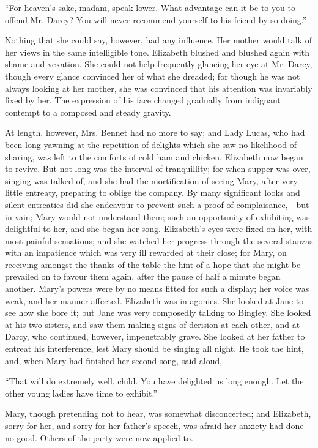 \documentclass[12pt,openright]{book}
\begin{document}
“For heaven’s sake, madam, speak lower. What advantage can it be to you to offend Mr. Darcy? You will never recommend yourself to his friend by so doing.”

Nothing that she could say, however, had any influence. Her mother would talk of her views in the same intelligible tone. Elizabeth blushed and blushed again with shame and vexation. She could not help frequently glancing her eye at Mr. Darcy, though every glance convinced her of what she dreaded; for though he was not always looking at her mother, she was convinced that his attention was invariably fixed by her. The expression of his face changed gradually from indignant contempt to a composed and steady gravity.

At length, however, Mrs. Bennet had no more to say; and Lady Lucas, who had been long yawning at the repetition of delights which she saw no likelihood of sharing, was left to the comforts of cold ham and chicken. Elizabeth now began to revive. But not long was the interval of tranquillity; for when supper was over, singing was talked of, and she had the mortification of seeing Mary, after very little entreaty, preparing to oblige the company. By many significant looks and silent entreaties did she endeavour to prevent such a proof of complaisance,—but in vain; Mary would not understand them; such an opportunity of exhibiting was delightful to her, and she began her song. Elizabeth’s eyes were fixed on her, with most painful sensations; and she watched her progress through the several stanzas with an impatience which was very ill rewarded at their close; for Mary, on receiving amongst the thanks of the table the hint of a hope that she might be prevailed on to favour them again, after the pause of half a minute began another. Mary’s powers were by no means fitted for such a display; her voice was weak, and her manner affected. Elizabeth was in agonies. She looked at Jane to see how she bore it; but Jane was very composedly talking to Bingley. She looked at his two sisters, and saw them making signs of derision at each other, and at Darcy, who continued, however, impenetrably grave. She looked at her father to entreat his interference, lest Mary should be singing all night. He took the hint, and, when Mary had finished her second song, said aloud,—

“That will do extremely well, child. You have delighted us long enough. Let the other young ladies have time to exhibit.”

Mary, though pretending not to hear, was somewhat disconcerted; and Elizabeth, sorry for her, and sorry for her father’s speech, was afraid her anxiety had done no good. Others of the party were now applied to.
\end{document}
